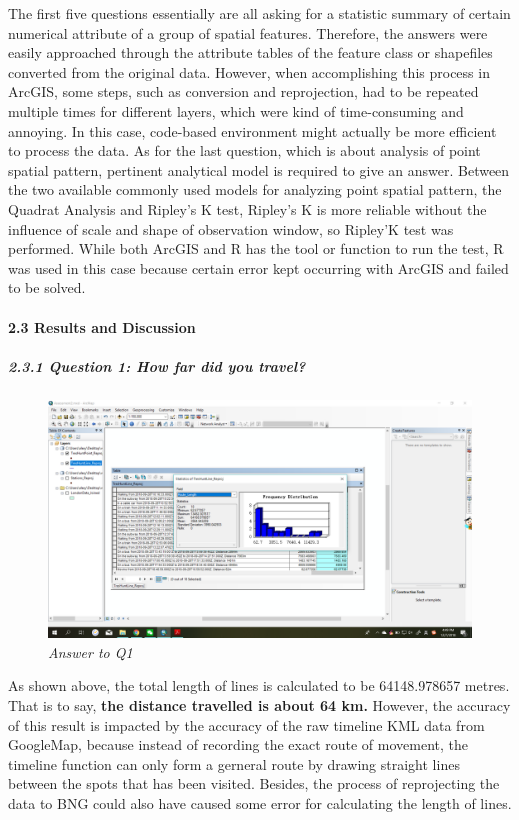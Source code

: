\documentclass[]{article}
\let\oldparagraph\paragraph
\renewcommand{\paragraph}[1]{\oldparagraph{#1}\mbox{}}
\let\oldsubparagraph\subparagraph
\renewcommand{\subparagraph}[1]{\oldsubparagraph{#1}\mbox{}}
\begin{document}
The first five questions essentially are all asking for a statistic
summary of certain numerical attribute of a group of spatial features.
Therefore, the answers were easily approached through the attribute
tables of the feature class or shapefiles converted from the original
data. However, when accomplishing this process in ArcGIS, some steps,
such as conversion and reprojection, had to be repeated multiple times
for different layers, which were kind of time-consuming and annoying. In
this case, code-based environment might actually be more efficient to
process the data. As for the last question, which is about analysis of
point spatial pattern, pertinent analytical model is required to give an
answer. Between the two available commonly used models for analyzing
point spatial pattern, the Quadrat Analysis and Ripley's K test,
Ripley's K is more reliable without the influence of scale and shape of
observation window, so Ripley'K test was performed. While both ArcGIS
and R has the tool or function to run the test, R was used in this case
because certain error kept occurring with ArcGIS and failed to be
solved.

\paragraph{2.3 Results and Discussion}\label{results-and-discussion}

\subparagraph{2.3.1 Question 1: How far did you
travel?}\label{question-1-how-far-did-you-travel}

\begin{figure}
\centering
\includegraphics{Part2/pngs/Q1.png}
\caption{\emph{Answer to Q1}}
\end{figure}

As shown above, the total length of lines is calculated to be
64148.978657 metres. That is to say, \textbf{the distance travelled is
about 64 km.} However, the accuracy of this result is impacted by the
accuracy of the raw timeline KML data from GoogleMap, because instead of
recording the exact route of movement, the timeline function can only
form a gerneral route by drawing straight lines between the spots that
has been visited. Besides, the process of reprojecting the data to BNG
could also have caused some error for calculating the length of lines.
\end{document}
